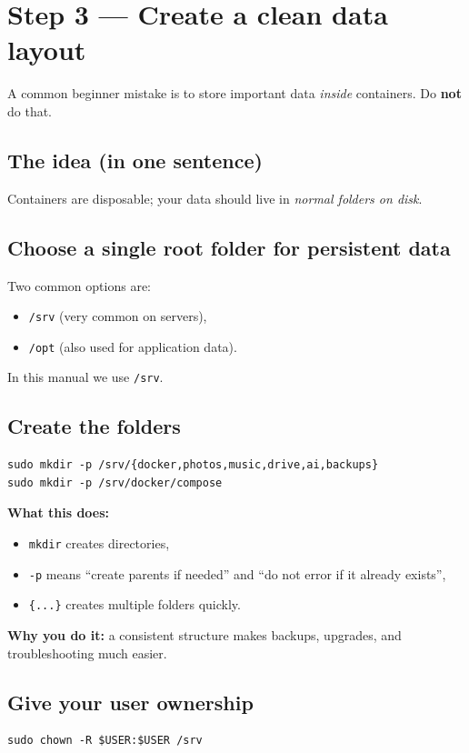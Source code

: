 \section{Step 3 --- Create a clean data layout}
A common beginner mistake is to store important data \emph{inside} containers.
Do \textbf{not} do that.

\subsection*{The idea (in one sentence)}
Containers are disposable; your data should live in \emph{normal folders on disk}.

\subsection*{Choose a single root folder for persistent data}
Two common options are:
\begin{itemize}[leftmargin=*]
  \item \texttt{/srv} (very common on servers),
  \item \texttt{/opt} (also used for application data).
\end{itemize}

In this manual we use \texttt{/srv}.

\subsection*{Create the folders}
\begin{lstlisting}
sudo mkdir -p /srv/{docker,photos,music,drive,ai,backups}
sudo mkdir -p /srv/docker/compose
\end{lstlisting}

\textbf{What this does:}
\begin{itemize}[leftmargin=*]
  \item \texttt{mkdir} creates directories,
  \item \texttt{-p} means ``create parents if needed'' and ``do not error if it already exists'',
  \item \texttt{\{...\}} creates multiple folders quickly.
\end{itemize}

\textbf{Why you do it:} a consistent structure makes backups, upgrades, and troubleshooting much easier.

\subsection*{Give your user ownership}
\begin{lstlisting}
sudo chown -R $USER:$USER /srv
\end{lstlisting}

